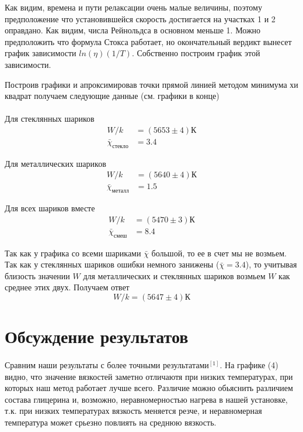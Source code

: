 \documentclass[a4paper, 12pt]{article}
\begin{document}
    Как видим, времена и пути релаксации очень малые величины, поэтому предположение что установившейся скорость достигается на участках 1 и 2 оправдано. Как видим, числа Рейнольдса в основном меньше 1. Можно предположить что формула Стокса работает, но окончательный вердикт вынесет график зависимости $ln(\eta)(1/T)$. Собственно построим график этой зависимости.

    Построив графики и апроксимировав точки прямой линией методом минимума хи квадрат получаем следующие данные (см. графики в конце)

    \paragraph{}
    Для стеклянных шариков
    \begin{align*}
        W/k &= (5653 \pm 4)К\\
        \bar \chi_{стекло} &= 3.4
    \end{align*}

    Для металлических шариков
    \begin{align*}
        W/k &= (5640 \pm 4)К\\
        \bar \chi_{металл} &= 1.5
    \end{align*}

    Для всех шариков вместе
    \begin{align*}
        W/k &= (5470 \pm 3)К\\
        \bar \chi_{смеш} &= 8.4
    \end{align*}

    Так как у графика со всеми шариками $\bar \chi$ большой, то ее в счет мы не возмьем. Так как у стеклянных шариков ошибки немного занижены ($\bar \chi =3.4$), то учитывая близость значении $W$ для металлических и стеклянных шариков возмьем $W$ как среднее этих двух. Получаем ответ
    \begin{equation}
        W/k = (5647 \pm 4)К
    \end{equation}

    \section{Обсуждение результатов}

    \paragraph{}
    Сравним наши результаты с более точными результатами$^{[1]}$. На графике (4) видно, что значение вязкостей заметно отличаютя при низких температурах, при которых наш метод работает лучше всего. Различие можно обьяснить различием состава глицерина и, возможно, неравномерностью нагрева в нашей установке, т.к. при низких температурах вязкость меняется резче, и неравномерная температура может срьезно повлиять на среднюю вязкость.
\end{document}
